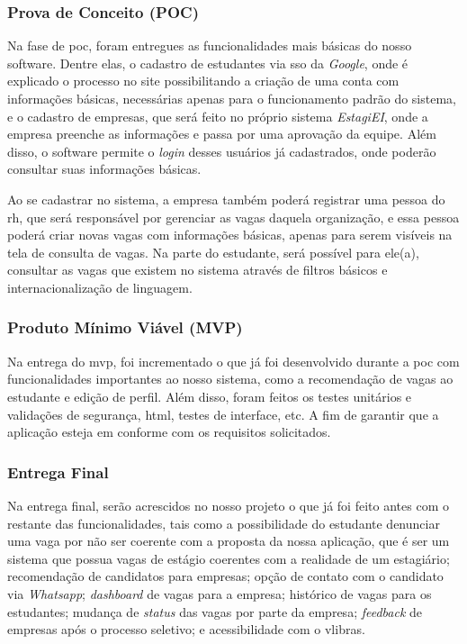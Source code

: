 \subsubsection{Prova de Conceito (POC)} \label{entrega-poc}

Na fase de \ac{poc}, foram entregues as funcionalidades mais básicas do nosso software. Dentre elas, o cadastro de estudantes via \ac{sso} da \textit{Google}, onde é explicado o processo no site possibilitando a criação de uma conta com informações básicas, necessárias apenas para o funcionamento padrão do sistema, e o cadastro de empresas, que será feito no próprio sistema \emph{EstagiEI}, onde a empresa preenche as informações e passa por uma aprovação da equipe. Além disso, o software permite o \textit{login} desses usuários já cadastrados, onde poderão consultar suas informações básicas.

Ao se cadastrar no sistema, a empresa também poderá registrar uma pessoa do \ac{rh}, que será responsável por gerenciar as vagas daquela organização, e essa pessoa poderá criar novas vagas com informações básicas, apenas para serem visíveis na tela de consulta de vagas. Na parte do estudante, será possível para ele(a), consultar as vagas que existem no sistema através de filtros básicos e internacionalização de linguagem.

\subsubsection{Produto Mínimo Viável (MVP)}

Na entrega do \ac{mvp}, foi incrementado o que já foi desenvolvido durante a \ac{poc} com funcionalidades importantes ao nosso sistema, como a recomendação de vagas ao estudante e edição de perfil. Além disso, foram feitos os testes unitários e validações de segurança, \ac{html}, testes de interface, etc. A fim de garantir que a aplicação esteja em conforme com os requisitos solicitados.

\subsubsection{Entrega Final}

Na entrega final, serão acrescidos no nosso projeto o que já foi feito antes com o restante das funcionalidades, tais como a possibilidade do estudante denunciar uma vaga por não ser coerente com a proposta da nossa aplicação, que é ser um sistema que possua vagas de estágio coerentes com a realidade de um estagiário; recomendação de candidatos para empresas; opção de contato com o candidato via \textit{Whatsapp}; \textit{dashboard} de vagas para a empresa; histórico de vagas para os estudantes; mudança de \textit{status} das vagas por parte da empresa; \textit{feedback} de empresas após o processo seletivo; e acessibilidade com o \gls{vlibras}.